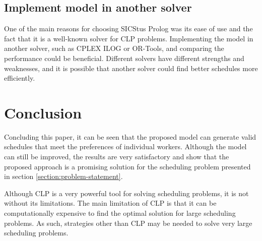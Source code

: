 \documentclass[conference]{IEEEtran}
\begin{document}
\subsection*{Implement model in another solver}

One of the main reasons for choosing SICStus Prolog was its ease of use and the fact that it is a well-known solver for CLP problems. 
Implementing the model in another solver, such as CPLEX ILOG or OR-Tools, and comparing the performance could be beneficial. Different solvers have different strengths and weaknesses, and it is possible that another solver could find better schedules more efficiently.

\section{Conclusion}
\label{section:conclusion}

Concluding this paper, it can be seen that the proposed model can generate valid schedules that meet the preferences of individual workers. Although the model can still be improved, the results are very satisfactory and show that the proposed approach is a promising solution for the scheduling problem presented in section \ref{section:problem-statement}.

Although CLP is a very powerful tool for solving scheduling problems, it is not without its limitations. The main limitation of CLP is that it can be computationally expensive to find the optimal solution for large scheduling problems.
As such, strategies other than CLP may be needed to solve very large scheduling problems.

% 
% 

\onecolumn
\appendix

\tikzset{
    const plot,
}
\end{document}
